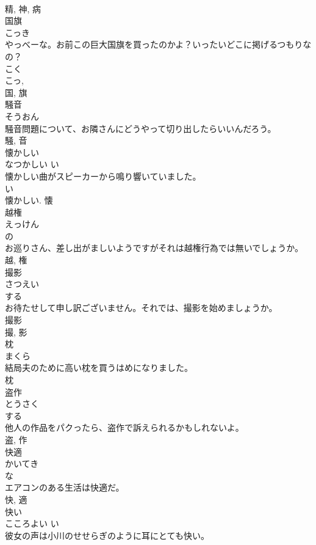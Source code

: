 \documentclass[8pt]{extreport}
\begin{document}
\begin{CJK}{UTF8}{min}
\\	精, 神, 病	
\\	国旗	
\\	こっき	
\\	やっべーな。お前この巨大国旗を買ったのかよ？いったいどこに掲げるつもりなの？	
\\	こく 
\\	こっ, 
\\	国, 旗	
\\	騒音	
\\	そうおん	
\\	騒音問題について、お隣さんにどうやって切り出したらいいんだろう。	
\\	騒, 音	
\\	懐かしい	
\\	なつかしい	い 
\\	懐かしい曲がスピーカーから鳴り響いていました。	
\\	い 
\\	懐かしい.	懐	
\\	越権	
\\	えっけん	
\\	の 
\\	お巡りさん、差し出がましいようですがそれは越権行為では無いでしょうか。	
\\	越, 権	
\\	撮影	
\\	さつえい	
\\	する 
\\	お待たせして申し訳ございません。それでは、撮影を始めましょうか。	
\\	撮影 
\\	撮, 影	
\\	枕	
\\	まくら	
\\	結局夫のために高い枕を買うはめになりました。	
\\	枕	
\\	盗作	
\\	とうさく	
\\	する 
\\	他人の作品をパクったら、盗作で訴えられるかもしれないよ。	
\\	盗, 作	
\\	快適	
\\	かいてき	
\\	な 
\\	エアコンのある生活は快適だ。	
\\	快, 適	
\\	快い	
\\	こころよい	い 
\\	彼女の声は小川のせせらぎのように耳にとても快い。	

\end{CJK}
\end{document}
